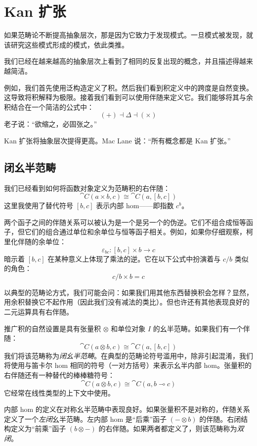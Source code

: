 \documentclass[DaoFP]{subfiles}
\begin{document}
\setcounter{chapter}{19}

\chapter{Kan 扩张}

如果范畴论不断提高抽象层次，那是因为它致力于发现模式。一旦模式被发现，就该研究这些模式形成的模式，依此类推。

我们已经在越来越高的抽象层次上看到了相同的反复出现的概念，并且描述得越来越简洁。

例如，我们首先使用泛构造定义了积。然后我们看到积定义中的跨度是自然变换。这导致将积解释为极限。接着我们看到可以使用伴随来定义它。我们能够将其与余积结合在一个简洁的公式中：
\[ (+) \dashv \Delta \dashv (\times) \]
老子说：“欲缩之，必固张之。”

Kan 扩张将抽象层次提得更高。Mac Lane 说：“所有概念都是 Kan 扩张。”

\section{闭幺半范畴}

我们已经看到如何将函数对象定义为范畴积的右伴随：
\[ \cat C (a \times b, c) \cong \cat C (a, [b, c]) \]
这里我使用了替代符号 $[b, c]$ 表示内部 hom——即指数 $c^b$。

两个函子之间的伴随关系可以被认为是一个是另一个的伪逆。它们不组合成恒等函子，但它们的组合通过单位和余单位与恒等函子相关。例如，如果你仔细观察，柯里化伴随的余单位：
\[ \varepsilon_{b c} \colon [b, c] \times b \to c \]
暗示着 $[b, c]$ 在某种意义上体现了乘法的逆。它在以下公式中扮演着与 $c/b$ 类似的角色：
\[ c/b \times b = c \]

以典型的范畴论方式，我们可能会问：如果我们用其他东西替换积会怎样？显然，用余积替换它不起作用（因此我们没有减法的类比）。但也许还有其他表现良好的二元运算具有右伴随。

推广积的自然设置是具有张量积 $\otimes$ 和单位对象 $I$ 的幺半范畴。如果我们有一个伴随：
\[ \cat C (a \otimes b, c) \cong \cat C (a, [b, c]) \]
我们将该范畴称为\emph{闭幺半范畴}。在典型的范畴论符号滥用中，除非引起混淆，我们将使用与笛卡尔 hom 相同的符号（一对方括号）来表示幺半内部 hom。张量积的右伴随还有一种替代的棒棒糖符号：
\[ \cat C (a \otimes b, c) \cong \cat C (a, b \multimap c) \]
它经常在线性类型的上下文中使用。

内部 hom 的定义在对称幺半范畴中表现良好。如果张量积不是对称的，伴随关系定义了一个\emph{左闭}幺半范畴。左内部 hom 是“后乘”函子 $(- \otimes b)$ 的伴随。右闭结构定义为“前乘”函子 $(b \otimes -)$ 的右伴随。如果两者都定义了，则该范畴称为\emph{双闭}。
\end{document}
